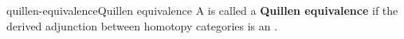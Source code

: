 \begin{topic}{quillen-equivalence}{Quillen equivalence}
    A  is called a \textbf{Quillen equivalence} if the derived adjunction between homotopy categories is an .
\end{topic}



  
